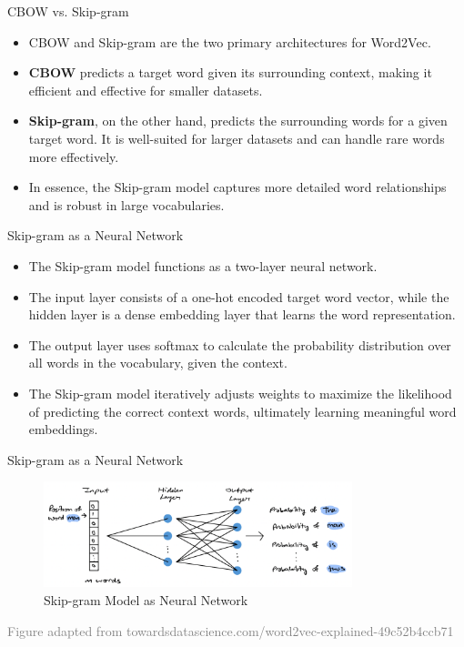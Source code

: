 \documentclass[serif, aspectratio=169]{beamer}
\begin{document}
\begin{frame}{CBOW vs. Skip-gram}
	\begin{itemize}
		\item CBOW and Skip-gram are the two primary architectures for Word2Vec.
		\item \textbf{CBOW} predicts a target word given its surrounding context, making it efficient and effective for smaller datasets.
		\item \textbf{Skip-gram}, on the other hand, predicts the surrounding words for a given target word. It is well-suited for larger datasets and can handle rare words more effectively.
		\item In essence, the Skip-gram model captures more detailed word relationships and is robust in large vocabularies.
	\end{itemize}
\end{frame}


\begin{frame}{Skip-gram as a Neural Network}
    \begin{itemize}
        \item The Skip-gram model functions as a two-layer neural network. 
        \item The input layer consists of a one-hot encoded target word vector, while the hidden layer is a dense embedding layer that learns the word representation.
        \item The output layer uses softmax to calculate the probability distribution over all words in the vocabulary, given the context.
        \item The Skip-gram model iteratively adjusts weights to maximize the likelihood of predicting the correct context words, ultimately learning meaningful word embeddings.
    \end{itemize}
\end{frame}


\begin{frame}{Skip-gram as a Neural Network}
	\begin{figure}
		\centering
		\includegraphics[width=0.8\textwidth]{pic/skip_nn.png}
		\caption*{Skip-gram Model as Neural Network}
	\end{figure}
	\vspace{1.0cm}
	\hspace{-1.0cm}
	{\tiny \textcolor{gray}{Figure adapted from towardsdatascience.com/word2vec-explained-49c52b4ccb71}}
\end{frame}
\end{document}
